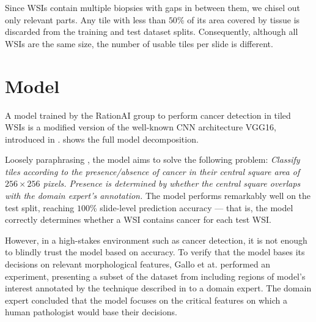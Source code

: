 Since WSIs contain multiple biopsies with gaps in between them, we chisel out only relevant parts.
Any tile with less than $50$\% of its area covered by tissue is discarded from the training and test dataset splits.
Consequently, although all WSIs are the same size, the number of usable tiles per slide is different.

\section{Model}\label{model}

A model trained by the RationAI group to perform cancer detection in tiled WSIs is a modified version of the well-known CNN architecture VGG16, introduced in \cite{vgg16}.
 shows the full model decomposition.

Loosely paraphrasing \cite{gallo}, the model aims to solve the following problem: 
\emph{
Classify tiles according to the presence/absence of cancer in their central square area of $256 \times 256 $ pixels.
Presence is determined by whether the central square overlaps with the domain expert's annotation.
}
The model performs remarkably well on the test split, reaching $100$\% slide-level prediction accuracy --- that is, the model correctly determines whether a WSI contains cancer for each test WSI.

However, in a high-stakes environment such as cancer detection, it is not enough to blindly trust the model based on accuracy.
To verify that the model bases its decisions on relevant morphological features, Gallo et at. \cite{gallo} performed an experiment, presenting a subset of the dataset from  including regions of model's interest annotated by the technique described in  to a domain expert.
The domain expert concluded that the model focuses on the critical features on which a human pathologist would base their decisions.

